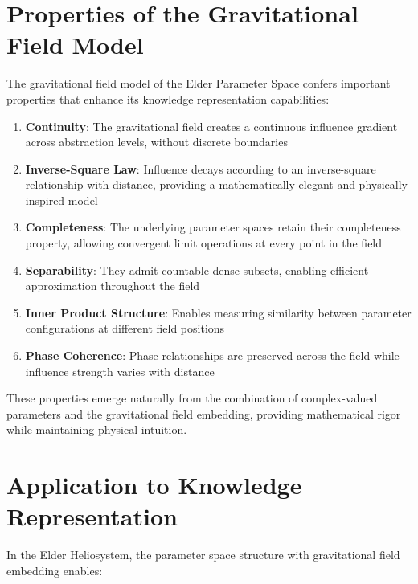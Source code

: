 \section{Properties of the Gravitational Field Model}

The gravitational field model of the Elder Parameter Space confers important properties that enhance its knowledge representation capabilities:

\begin{enumerate}
    \item \textbf{Continuity}: The gravitational field creates a continuous influence gradient across abstraction levels, without discrete boundaries
    
    \item \textbf{Inverse-Square Law}: Influence decays according to an inverse-square relationship with distance, providing a mathematically elegant and physically inspired model
    
    \item \textbf{Completeness}: The underlying parameter spaces retain their completeness property, allowing convergent limit operations at every point in the field
    
    \item \textbf{Separability}: They admit countable dense subsets, enabling efficient approximation throughout the field
    
    \item \textbf{Inner Product Structure}: Enables measuring similarity between parameter configurations at different field positions
    
    \item \textbf{Phase Coherence}: Phase relationships are preserved across the field while influence strength varies with distance
\end{enumerate}

These properties emerge naturally from the combination of complex-valued parameters and the gravitational field embedding, providing mathematical rigor while maintaining physical intuition.

\section{Application to Knowledge Representation}

In the Elder Heliosystem, the parameter space structure with gravitational field embedding enables:

